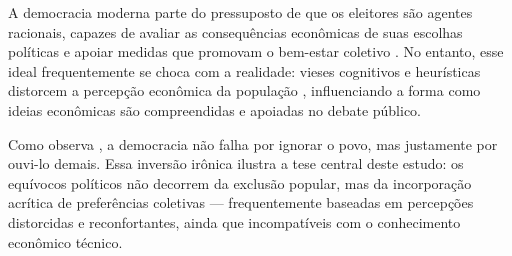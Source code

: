 


A democracia moderna parte do pressuposto de que os eleitores são agentes racionais, capazes de avaliar as consequências econômicas de suas escolhas políticas e apoiar medidas que promovam o bem-estar coletivo \cite{downs1957economic}. No entanto, esse ideal frequentemente se choca com a realidade: vieses cognitivos e heurísticas distorcem a percepção econômica da população \cite{The_Myth_of_the_Rational_Voter,kahneman2011thinking}, influenciando a forma como ideias econômicas são compreendidas e apoiadas no debate público.

Como observa , a democracia não falha por ignorar o povo, mas justamente por ouvi-lo demais. Essa inversão irônica ilustra a tese central deste estudo: os equívocos políticos não decorrem da exclusão popular, mas da incorporação acrítica de preferências coletivas — frequentemente baseadas em percepções distorcidas e reconfortantes, ainda que incompatíveis com o conhecimento econômico técnico.

